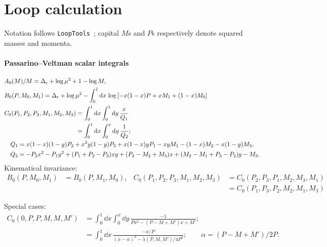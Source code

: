 \documentclass[CheatSheet]{subfiles}
\begin{document}
\summarystyle
\section{Loop calculation}
Notation follows \texttt{LoopTools}~\cite{looptools}; capital $M$s and $P$s respectively denote squared masses and momenta.
\paragraph{Passarino--Veltman scalar integrals}
\begin{align}
& A_0(M)/M = \Delta_\epsilon+\log\mu^2+1-\log M,\\
& B_0(P, M_0, M_1) = \Delta_\epsilon + \log \mu^2 - \int_0^1\mathop{}\!\mathrm{d} x\,\log\left[
    -x(1-x)P+x M_1+(1-x)M_0
\right]\\
& C_0(P_1, P_2, P_3, M_1, M_2, M_3)
= \int_0^1 \mathop{}\!\mathrm{d} x \int_0^1\mathop{}\!\mathrm{d} y\,
  \frac{x}{Q_1}\\
&\phantom{C_0(P_1, P_2, P_3, M_1, M_2, M_3)}
= \int_0^1 \mathop{}\!\mathrm{d} x \int_0^x\mathop{}\!\mathrm{d} y\,
  \frac{1}{Q_2};
\\
&\quad Q_1=x(1-x)(1-y)P_2 + x^2 y(1-y)P_3 + x(1-x)y P_1 - x y M_1 - (1-x) M_2 - x(1-y) M_3,\notag\\
&\quad Q_2=-P_2x^2-P_1y^2+(P_1+P_2-P_3)x y + (P_2-M_2+M_3)x + (M_2-M_1+P_3-P_2)y-M_3.\notag
\end{align}
Kinematical invariance:
\begin{equation}
\begin{split}
 B_0(P, M_0, M_1) &= B_0(P, M_1, M_0),
 &
 C_0(P_1,P_2,P_3,M_1,M_2,M_3) &= C_0(P_2,P_3,P_1,M_2,M_3,M_1)
                        \\&& &= C_0(P_1,P_3,P_2,M_2,M_1,M_3)
\end{split}
\end{equation}

Special cases:
\begin{equation}
\begin{split}
  C_0(0,P,P,M,M,M')
 &= \int_0^1 \dd x \int_0^x\dd y\,
  \frac{-1}{Px^2-(P-M+M')x+M'};
\\ &= \int_0^1 \dd x\,
  \frac{-x/P}{(x-\alpha)^2-\lambda(P,M,M')/4P^2};\qquad \alpha=(P-M+M')/2P.
\end{split}
\end{equation}


\clearpage
\detailstyle
\changefontsizes{9pt}
\end{document}

